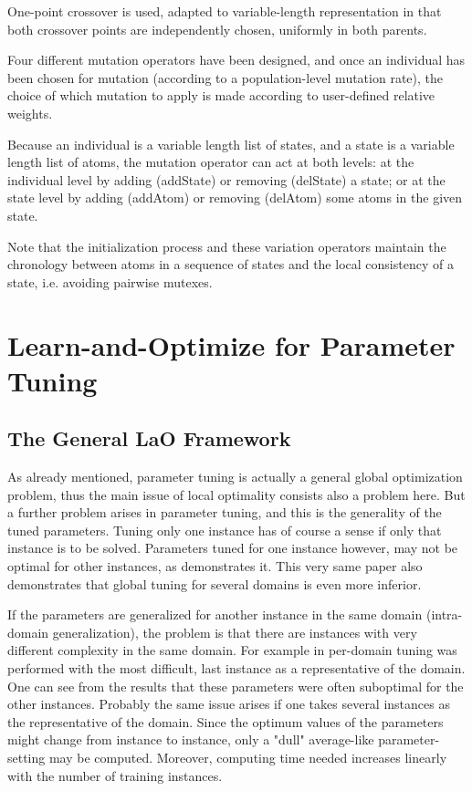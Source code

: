 \documentclass{MYsig-alternate}
\begin{document}
One-point crossover is used, adapted to variable-length representation in that both crossover points are independently chosen, uniformly in both parents.

Four different mutation operators have been designed, and once an individual has been chosen for mutation (according to a population-level mutation rate), the choice of which mutation to apply is made according to user-defined relative weights. 

Because an individual is a variable length list of states, and a state is a variable length list of atoms, the mutation 
operator can act at both levels: at the individual level by adding (addState) or removing (delState) 
a state; or at the state level by adding (addAtom) or removing (delAtom) some atoms in the given state. 

Note that the initialization process and these variation operators maintain the chronology between atoms in a sequence of states and the local consistency of a state, i.e. avoiding pairwise mutexes.

\section{Learn-and-Optimize for Parameter Tuning}
\label{section:LaO}

\subsection{The General LaO Framework}

As already mentioned, parameter tuning is actually a general global optimization problem, thus the main issue of local optimality consists also a problem here. But a further problem arises in parameter tuning, and this is the generality of the tuned parameters. Tuning only one instance has of course a sense if only that instance is to be solved. Parameters tuned for one instance however, may not be optimal for other instances, as \cite{BibGECCO:2010} demonstrates it. This very same paper also demonstrates that global tuning for several domains is even more inferior.

If the parameters are generalized for another instance in the same domain (intra-domain generalization), the problem is that there are instances with very different complexity in the same domain. For example in \cite{BibGECCO:2010} per-domain tuning was performed with the most difficult, last instance as a representative of the domain. One can see from the results that these parameters were often suboptimal for the other instances. Probably the same issue arises if one takes several instances as the representative of the domain. Since the optimum values of the parameters might change from instance to instance, only a "dull" average-like parameter-setting may be computed. Moreover, computing time needed increases linearly with the number of training instances. 
\end{document}
